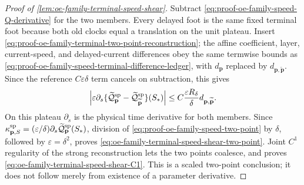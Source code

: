 \begin{proof}[Proof of
\cref{lem:oe-family-terminal-speed-shear}]
Subtract
\cref{eq:proof-oe-family-speed-Q-derivative} for the two members.
Every delayed foot is the same fixed terminal foot because both old
clocks equal a translation on the unit plateau.  Insert
\cref{eq:proof-oe-family-terminal-two-point-reconstruction}; the affine
coefficient, layer, current-speed, and delayed-current differences obey
the same termwise bounds as
\cref{eq:proof-oe-family-speed-terminal-difference-ledger}, with
\(d_{\mathbf p}\) replaced by
\(d_{\mathbf p,\widetilde{\mathbf p}}\).  Since the reference
\(C\varepsilon\delta\) term cancels on subtraction, this gives
\begin{equation}
 \left|\varepsilon\partial_s
   \{\widetilde{\mathcal Q}_{\mathbf p}^{\rm sp}
       -\widetilde{\mathcal Q}_{\widetilde{\mathbf p}}^{\rm sp}\}
       (S_*)\right|
 \le C\frac{\varepsilon R_\delta}{\delta}
       d_{\mathbf p,\widetilde{\mathbf p}}.     \label{eq:proof-oe-family-speed-two-point}
\end{equation}
On this plateau \(\partial_s\) is the physical time derivative for both
members.  Since
\(\kappa_{\mathbf p,S}^{\rm sp}
=(\varepsilon/\delta)
\partial_s\widetilde{\mathcal Q}_{\mathbf p}^{\rm sp}(S_*)\),
division of
\cref{eq:proof-oe-family-speed-two-point} by \(\delta\), followed by
\(\varepsilon=\delta^2\), proves
\cref{eq:oe-family-terminal-speed-shear-two-point}.  Joint \(C^1\)
regularity of the strong reconstruction lets the two points coalesce,
and proves
\cref{eq:oe-family-terminal-speed-shear-C1}.  This is a scaled
two-point conclusion; it does not follow merely from existence of a
parameter derivative.
\end{proof}

